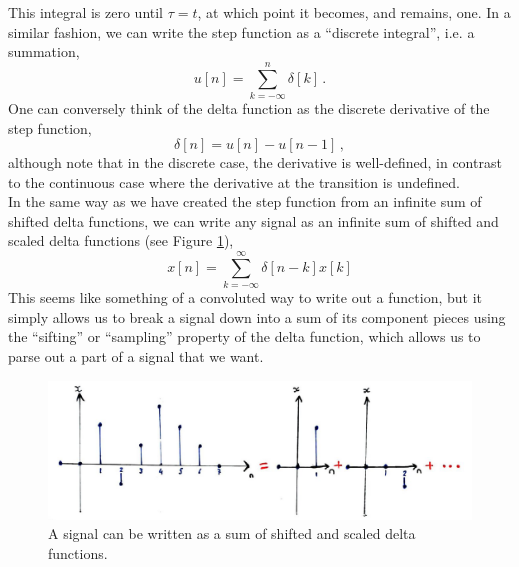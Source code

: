 %
This integral is zero until $\tau = t$, at which point it becomes, and remains, one. In a similar
fashion, we can write the step function as a ``discrete integral'', i.e. a summation,
%
\begin{equation}
  u[n] = \sum_{k=-\infty}^n \delta[k] \,.
\end{equation}
%
One can conversely think of the delta function as the discrete derivative of the step function,
%
\begin{equation}
  \delta[n] = u[n] - u[n-1] \,,
\end{equation}
%
although note that in the discrete case, the derivative is well-defined, in contrast to the continuous
case where the derivative at the transition is undefined.\\
%
In the same way as we have created the step function from an infinite sum of shifted delta functions,
we can write any signal as an infinite sum of shifted and scaled delta functions (see Figure
\ref{fig::lecture_1_sum_of_deltas}),
%
\begin{equation}
  x[n] = \sum_{k=-\infty}^\infty \delta[n-k] x[k]
\end{equation}
%
This seems like something of a convoluted way to write out a function, but it simply allows us to
break a signal down into a sum of its component pieces using the ``sifting'' or ``sampling'' property
of the delta function, which allows us to parse out a part of a signal that we want.
%
\begin{figure}[H]
  \includegraphics[width=\textwidth]{images/lecture_1_sum_of_deltas.JPG}
  \caption{
    A signal can be written as a sum of shifted and scaled delta functions.
  }
  \label{fig::lecture_1_sum_of_deltas}
\end{figure}

